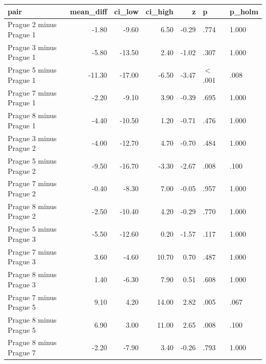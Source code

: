 \begin{tabular}{lrrrrll}
  \toprule
pair & mean\_diff & ci\_low & ci\_high & z & p & p\_holm \\ 
  \midrule
Prague 2 minus Prague 1 & -1.80 & -9.60 & 6.50 & -0.29 & .774 & 1.000 \\ 
  Prague 3 minus Prague 1 & -5.80 & -13.50 & 2.40 & -1.02 & .307 & 1.000 \\ 
  Prague 5 minus Prague 1 & -11.30 & -17.00 & -6.50 & -3.47 & $<$ .001 & .008 \\ 
  Prague 7 minus Prague 1 & -2.20 & -9.10 & 3.90 & -0.39 & .695 & 1.000 \\ 
  Prague 8 minus Prague 1 & -4.40 & -10.50 & 1.20 & -0.71 & .476 & 1.000 \\ 
  Prague 3 minus Prague 2 & -4.00 & -12.70 & 4.70 & -0.70 & .484 & 1.000 \\ 
  Prague 5 minus Prague 2 & -9.50 & -16.70 & -3.30 & -2.67 & .008 & .100 \\ 
  Prague 7 minus Prague 2 & -0.40 & -8.30 & 7.00 & -0.05 & .957 & 1.000 \\ 
  Prague 8 minus Prague 2 & -2.50 & -10.40 & 4.20 & -0.29 & .770 & 1.000 \\ 
  Prague 5 minus Prague 3 & -5.50 & -12.60 & 0.20 & -1.57 & .117 & 1.000 \\ 
  Prague 7 minus Prague 3 & 3.60 & -4.60 & 10.70 & 0.70 & .487 & 1.000 \\ 
  Prague 8 minus Prague 3 & 1.40 & -6.30 & 7.90 & 0.51 & .608 & 1.000 \\ 
  Prague 7 minus Prague 5 & 9.10 & 4.20 & 14.00 & 2.82 & .005 & .067 \\ 
  Prague 8 minus Prague 5 & 6.90 & 3.00 & 11.00 & 2.65 & .008 & .100 \\ 
  Prague 8 minus Prague 7 & -2.20 & -7.90 & 3.40 & -0.26 & .793 & 1.000 \\ 
   \bottomrule
\end{tabular}
